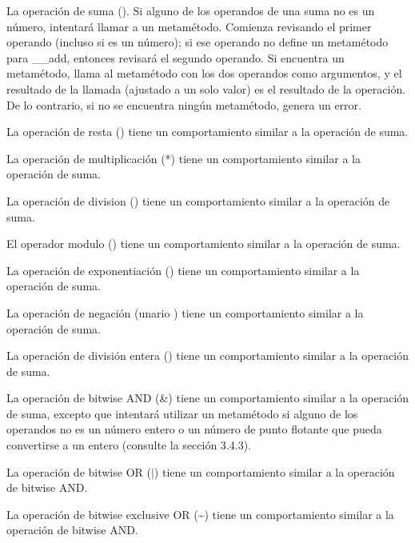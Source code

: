 \vspace{0.5cm}
\begin{description}
	 La operación de suma (\texthigh{+}). Si alguno de los operandos de una suma no es un número,  intentará llamar a un metamétodo. Comienza revisando el primer operando (incluso si es un número); si ese operando no define un metamétodo para \_\_add, entonces  revisará el segundo operando. Si  encuentra un metamétodo, llama al metamétodo con los dos operandos como argumentos, y el resultado de la llamada (ajustado a un solo valor) es el resultado de la operación. De lo contrario, si no se encuentra ningún metamétodo,  genera un error.

	 La operación de resta (\texthigh{-}) tiene un comportamiento similar a la operación de suma.

	 La operación de multiplicación (*) tiene un comportamiento similar a la operación de suma.

	 La operación de division (\texthigh{/}) tiene un comportamiento similar a la operación de suma.

	 El operador modulo (\texthigh{\%}) tiene un comportamiento similar a la operación de suma.

	 La operación de exponentiación (\texthigh{\textasciicircum{}}) tiene un comportamiento similar a la operación de suma.

	 La operación de negación (unario \texthigh{-}) tiene un comportamiento similar a la operación de suma.

	 La operación de división entera (\texthigh{//}) tiene un comportamiento similar a la operación de suma.

	 La operación de bitwise AND (\&) tiene un comportamiento similar a la operación de suma, excepto que  intentará utilizar un metamétodo si alguno de los operandos no es un número entero o un número de punto flotante que pueda convertirse a un entero (consulte la sección 3.4.3).

	 La operación de bitwise OR ($\vert$) tiene un comportamiento similar a la operación de bitwise AND.

	 La operación de bitwise exclusive OR (\textasciitilde) tiene un comportamiento similar a la operación de bitwise AND.


\end{description}
